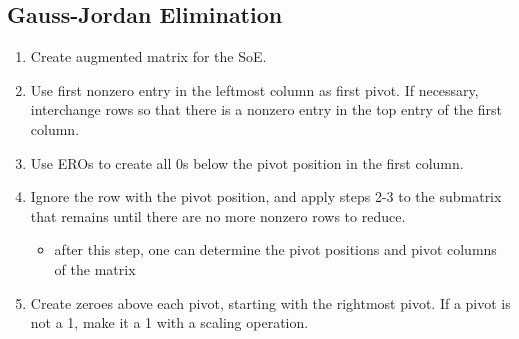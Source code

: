 \documentclass[a4paper,12pt]{article}
\theoremstyle{definition}
\theoremstyle{definition}
\begin{document}
	\subsection{Gauss-Jordan Elimination}
	\label{sec:g-j-elim}
	\begin{enumerate}
		\item Create augmented matrix for the SoE.
		
		\item Use first nonzero entry in the leftmost column as first pivot. If necessary, interchange rows so that there is a nonzero entry in the top entry of the first column.
		
		\item Use EROs to create all 0s below the pivot position in the first column.
		
		\item Ignore the row with the pivot position, and apply steps 2-3 to the submatrix that remains until there are no more nonzero rows to reduce.
		\begin{itemize}
			\item after this step, one can determine the pivot positions and pivot columns of the matrix
		\end{itemize}
		
		\item Create zeroes above each pivot, starting with the rightmost pivot. If a pivot is not a 1, make it a 1 with a scaling operation.
	\end{enumerate}
	\newpage
	
\end{document}
